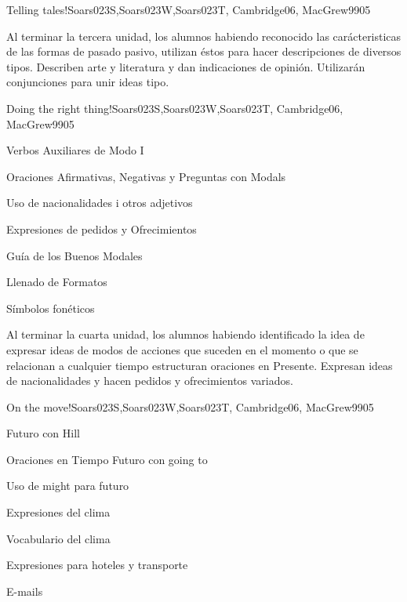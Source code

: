 \begin{syllabus}
\begin{unit}{Telling tales!}{Soars023S,Soars023W,Soars023T, Cambridge06, MacGrew99}{0}{5}
   \begin{learningoutcomes}
      \item Al terminar la tercera unidad, los alumnos habiendo reconocido las 
            carácteristicas  de las formas de pasado pasivo, utilizan éstos para 
            hacer descripciones de diversos tipos. Describen arte y literatura y 
            dan indicaciones de opinión. Utilizarán conjunciones para unir ideas tipo. 
   \end{learningoutcomes}
\end{unit}

\begin{unit}{Doing the right thing!}{Soars023S,Soars023W,Soars023T, Cambridge06, MacGrew99}{0}{5}
   \begin{topics}
      \item Verbos Auxiliares de Modo I
      \item Oraciones Afirmativas, Negativas y Preguntas con Modals
      \item Uso de nacionalidades i otros adjetivos
      \item Expresiones de pedidos y Ofrecimientos
      \item Guí­a de los Buenos Modales
      \item Llenado de Formatos
      \item Sí­mbolos fonéticos
   \end{topics}

   \begin{learningoutcomes}
      \item Al terminar la cuarta unidad, los alumnos habiendo identificado la idea de expresar ideas de modos de acciones que suceden en el momento o que se relacionan a cualquier tiempo estructuran oraciones en Presente. Expresan ideas de nacionalidades y hacen pedidos y ofrecimientos variados.
   \end{learningoutcomes}

\end{unit}

\begin{unit}{On the move!}{Soars023S,Soars023W,Soars023T, Cambridge06, MacGrew99}{0}{5}
   \begin{topics}
      \item Futuro con Hill
      \item Oraciones en Tiempo Futuro con going to
      \item Uso de might para futuro
      \item Expresiones del clima
      \item Vocabulario del clima
      \item Expresiones para hoteles y transporte
      \item E-mails
   \end{topics}


\end{unit}
\end{syllabus}
